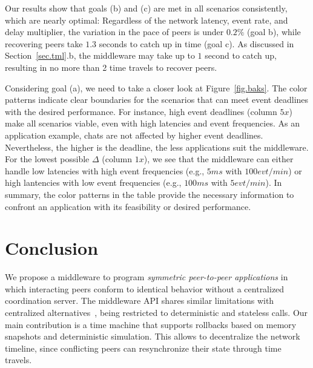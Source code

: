 \documentclass[12pt]{article}
\begin{document}

Our results show that goals (b) and (c) are met in all scenarios consistently,
which are nearly optimal:
Regardless of the network latency, event rate, and delay multiplier,
    the variation in the pace of peers is under $0.2\%$ (goal b), while
    recovering peers take $1.3$ seconds to catch up in time (goal c).
As discussed in Section~\ref{sec.tml}.b, the middleware may take up to $1$
second to catch up, resulting in no more than 2 time travels to recover peers.

Considering goal (a), we need to take a closer look at Figure~\ref{fig.baks}.
The color patterns indicate clear boundaries for the scenarios that can meet
event deadlines with the desired performance.
%
For instance, high event deadlines (column $5x$) make all scenarios viable,
even with high latencies and event frequencies.
As an application example, chats are not affected by higher event deadlines.
Nevertheless, the higher is the deadline, the less applications suit the
middleware.
%
For the lowest possible $\Delta$ (column $1x$), we see that the middleware can
either handle low latencies with high event frequencies (e.g., $5ms$ with
$100evt/min$) or high lantencies with low event frequencies (e.g., $100ms$ with
$5evt/min$).
%
In summary, the color patterns in the table provide the necessary information
to confront an application with its feasibility or desired performance.


\section{Conclusion}
\label{sec.conclusion}

We propose a middleware to program \emph{symmetric peer-to-peer applications}
in which interacting peers conform to identical behavior without a centralized
coordination server.
%
The middleware API shares similar limitations with centralized
alternatives~\cite{gals,croquet}, being restricted to deterministic and
stateless calls. %
%
Our main contribution is a time machine that supports rollbacks based on memory
snapshots and deterministic simulation.
This allows to decentralize the network timeline, since conflicting peers can
resynchronize their state through time travels.
%
\end{document}
